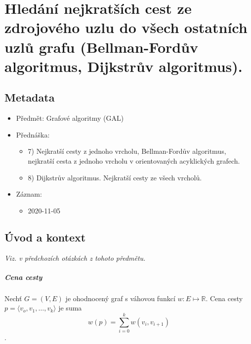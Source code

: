 

\chapter{Hledání nejkratších cest ze zdrojového uzlu do všech ostatních uzlů grafu (Bellman-Fordův algoritmus, Dijkstrův algoritmus).}


\section{Metadata}

\begin{itemize}
    \item Předmět: Grafové algoritmy (GAL)
    \item Přednáška:
    \begin{itemize}
        \item 7) Nejkratší cesty z jednoho vrcholu, Bellman-Fordův algoritmus, nejkratší cesta z jednoho vrcholu v orientovaných acyklických grafech.
        \item 8) Dijkstrův algoritmus. Nejkratší cesty ze všech vrcholů.
    \end{itemize}
    \item Záznam:
    \begin{itemize}
        \item 2020-11-05
    \end{itemize}
\end{itemize}


\section{Úvod a kontext}

\textit{Viz.  v předchozích otázkách z tohoto předmětu.}

\paragraph*{Cena cesty} Nechť $G = (V, E)$ je ohodnocený graf s váhovou funkcí $w: E \mapsto \mathbb{R}$. Cena cesty $p = \langle v_o, v_1, \dots, v_k \rangle$ je suma $$
w(p) = \sum_{i=0}^k w(v_i, v_{i+1})
$$.

